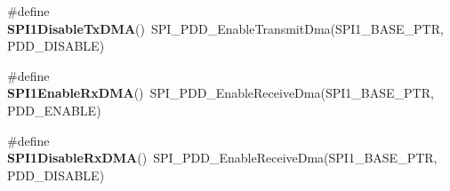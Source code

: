 \begin{DoxyCompactItemize}
\item 
\hypertarget{group___func_ala_gab5cadd36c3ff2e17e92e967d5e50af2e}{\#define {\bfseries S\-P\-I1\-Disable\-Tx\-D\-M\-A}()~S\-P\-I\-\_\-\-P\-D\-D\-\_\-\-Enable\-Transmit\-Dma(S\-P\-I1\-\_\-\-B\-A\-S\-E\-\_\-\-P\-T\-R, P\-D\-D\-\_\-\-D\-I\-S\-A\-B\-L\-E)}\label{group___func_ala_gab5cadd36c3ff2e17e92e967d5e50af2e}

\item 
\hypertarget{group___func_ala_ga9e31d3679f6ffd509a0b5a8c82ebef98}{\#define {\bfseries S\-P\-I1\-Enable\-Rx\-D\-M\-A}()~S\-P\-I\-\_\-\-P\-D\-D\-\_\-\-Enable\-Receive\-Dma(S\-P\-I1\-\_\-\-B\-A\-S\-E\-\_\-\-P\-T\-R, P\-D\-D\-\_\-\-E\-N\-A\-B\-L\-E)}\label{group___func_ala_ga9e31d3679f6ffd509a0b5a8c82ebef98}

\item 
\hypertarget{group___func_ala_gae635b4e15152b93316266846ddfb3cd8}{\#define {\bfseries S\-P\-I1\-Disable\-Rx\-D\-M\-A}()~S\-P\-I\-\_\-\-P\-D\-D\-\_\-\-Enable\-Receive\-Dma(S\-P\-I1\-\_\-\-B\-A\-S\-E\-\_\-\-P\-T\-R, P\-D\-D\-\_\-\-D\-I\-S\-A\-B\-L\-E)}\label{group___func_ala_gae635b4e15152b93316266846ddfb3cd8}

\end{DoxyCompactItemize}
